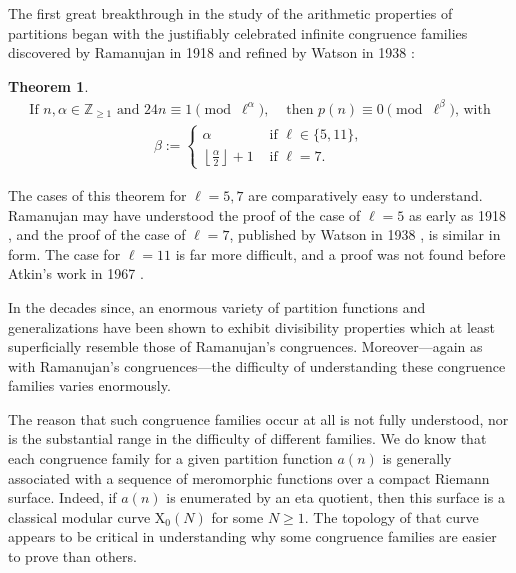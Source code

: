 \documentclass[reqno]{amsart}
\newtheorem{theorem}{Theorem}[section]
\theoremstyle{definition}
\theoremstyle{remark}
\numberwithin{equation}{section}
\begin{document}
The first great breakthrough in the study of the arithmetic properties of partitions began with the justifiably celebrated infinite congruence families discovered by Ramanujan in 1918 \cite{Ramanujan} and refined by Watson in 1938 \cite{Watson}:

\begin{theorem}\label{thorigconjecR}
\begin{align*}
\text{If } n,\alpha\in\mathbb{Z}_{\ge 1} \text{ and } 24n\equiv 1\pmod{\ell^{\alpha}},&\text{ then } p(n)\equiv 0\pmod{\ell^{\beta}}\text{, with}
\end{align*}\begin{align*}
\beta := 
\begin{cases}
\alpha & \text{ if } \ell\in\{5,11\},\\
\left\lfloor \frac{\alpha}{2} \right\rfloor + 1 & \text{ if } \ell=7.
\end{cases}
\end{align*}
\end{theorem}

The cases of this theorem for $\ell=5,7$ are comparatively easy to understand.  Ramanujan may have understood the proof of the case of $\ell=5$ as early as 1918 \cite{BO}, and the proof of the case of $\ell=7$, published by Watson in 1938 \cite{Watson}, is similar in form.  The case for $\ell=11$ is far more difficult, and a proof was not found before Atkin's work in 1967 \cite{Atkin}.

In the decades since, an enormous variety of partition functions and generalizations have been shown to exhibit divisibility properties which at least superficially resemble those of Ramanujan's congruences.  Moreover---again as with Ramanujan's congruences---the difficulty of understanding these congruence families varies enormously.

The reason that such congruence families occur at all is not fully understood, nor is the substantial range in the difficulty of different families.  We do know that each congruence family for a given partition function $a(n)$ is generally associated with a sequence of meromorphic functions over a compact Riemann surface.  Indeed, if $a(n)$ is enumerated by an eta quotient, then this surface is a classical modular curve $\mathrm{X}_0(N)$ for some $N\ge 1$. The topology of that curve appears to be critical in understanding why some congruence families are easier to prove than others. %
\end{document}

